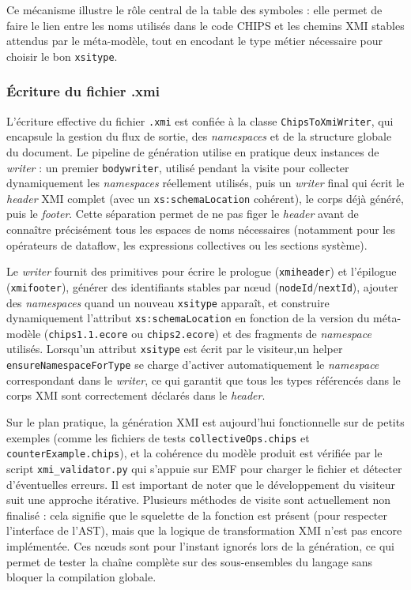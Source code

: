 \documentclass[a4paper, 11pt]{article}
\DeclareRobustCommand{\prog}[1]{\begingroup\urlstyle{tt}\nolinkurl{#1}\endgroup}
\begin{document}
Ce mécanisme illustre le rôle central de la table des symboles : elle permet de faire le lien entre les noms utilisés dans le code CHIPS et les chemins XMI stables attendus par le méta-modèle, tout en encodant le type métier nécessaire pour choisir le bon \prog{xsitype}.

\subsubsection{Écriture du fichier .xmi}

L’écriture effective du fichier \prog{.xmi} est confiée à la classe \prog{ChipsToXmiWriter}, qui encapsule la gestion du flux de sortie, des \emph{namespaces} et de la structure globale du document. Le pipeline de génération utilise en pratique deux instances de \emph{writer} : un premier \prog{bodywriter}, utilisé pendant la visite pour collecter dynamiquement les \emph{namespaces} réellement utilisés, puis un \emph{writer} final qui écrit le \emph{header} XMI complet (avec un \prog{xs:schemaLocation} cohérent), le corps déjà généré, puis le \emph{footer}. Cette séparation permet de ne pas figer le \emph{header} avant de connaître précisément tous les espaces de noms nécessaires (notamment pour les opérateurs de dataflow, les expressions collectives ou les sections système).

Le \emph{writer} fournit des primitives pour écrire le prologue (\prog{xmiheader}) et l’épilogue (\prog{xmifooter}), générer des identifiants stables par nœud (\prog{nodeId}/\prog{nextId}), ajouter des \emph{namespaces} quand un nouveau \prog{xsitype} apparaît, et construire dynamiquement l’attribut \prog{xs:schemaLocation} en fonction de la version du méta-modèle (\prog{chips1.1.ecore} ou \prog{chips2.ecore}) et des fragments de \emph{namespace} utilisés. Lorsqu’un attribut \prog{xsitype} est écrit par le visiteur,\newline un helper \prog{ensureNamespaceForType} se charge d’activer automatiquement le \emph{namespace} correspondant dans le \emph{writer}, ce qui garantit que tous les types référencés dans le corps XMI sont correctement déclarés dans le \emph{header}.

Sur le plan pratique, la génération XMI est aujourd’hui fonctionnelle sur de petits exemples (comme les fichiers de tests \prog{collectiveOps.chips} et \prog{counterExample.chips}), et la cohérence du modèle produit est vérifiée par le script \prog{xmi\_validator.py} qui s’appuie sur EMF pour charger le fichier et détecter d’éventuelles erreurs. Il est important de noter que le développement du visiteur suit une approche itérative. Plusieurs méthodes de visite sont actuellement non finalisé : cela signifie que le squelette de la fonction est présent (pour respecter l'interface de l'AST), mais que la logique de transformation XMI n'est pas encore implémentée. Ces nœuds sont pour l'instant ignorés lors de la génération, ce qui permet de tester la chaîne complète sur des sous-ensembles du langage sans bloquer la compilation globale.
\end{document}
